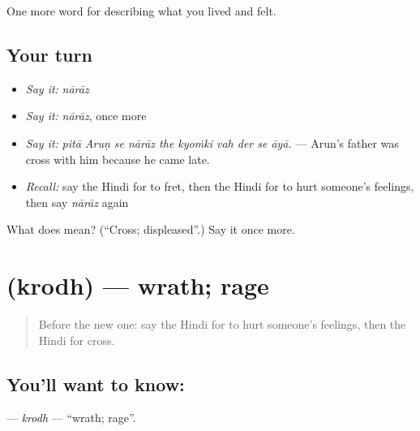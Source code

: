 \begin{grammarlens}[title={What you've built}]
One more word for describing what you lived and felt.
\end{grammarlens}

\subsection*{Your turn}
\begin{itemize}
\raggedright
  \item \emph{Say it:} \emph{nārāz}
  \item \emph{Say it:} \emph{nārāz}, once more
  \item \emph{Say it:} \emph{pitā Aruṇ se nārāz the kyoṁki vah der se āyā.} — Arun's father was cross with him because he came late.
  \item \emph{Recall:} say the Hindi for to fret, then the Hindi for to hurt someone's feelings, then say \emph{nārāz} again
\end{itemize}

\begin{tcolorbox}[breakable,colback=teal!4,colframe=teal!35!black,title={Before you move on}]
What does  mean? (\textquotedblleft{}Cross; displeased\textquotedblright{}.) Say it once more.
\end{tcolorbox}
\section[\texorpdfstring{\hi{क्रोध} (krodh)}{क्रोध (krodh)}]{ (krodh) — wrath; rage}

\label{lesson:HI-C456-krodh}



\begin{quote}
Before the new one: say the Hindi for to hurt someone's feelings, then the Hindi for cross.
\end{quote}

\subsection*{You'll want to know: }
\textbf{} — \emph{krodh} — \textquotedblleft{}wrath; rage\textquotedblright{}.

\begin{quote}
        
\end{quote}

